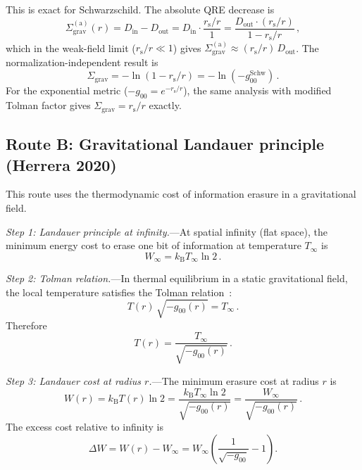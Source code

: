 \documentclass[aps,prd,preprint,superscriptaddress,longbibliography]{revtex4-2}
\newcommand{\kB}{k_{\mathrm{B}}}
\newcommand{\rs}{r_{\mathrm{s}}}
\newcommand{\Sgrav}{\Sigma_{\mathrm{grav}}}
\begin{document}
This is exact for Schwarzschild.  The absolute QRE decrease is
\begin{equation}
  \Sgrav^{(\mathrm{a})}(r)
  = D_{\mathrm{in}} - D_{\mathrm{out}}
  = D_{\mathrm{in}}\cdot\frac{\rs/r}{1}
  = \frac{D_{\mathrm{out}}\cdot(\rs/r)}{1-\rs/r}\,,
  \label{eq:Sigma_a}
\end{equation}
which in the weak-field limit ($\rs/r \ll 1$) gives
$\Sgrav^{(\mathrm{a})} \approx (\rs/r)\,D_{\mathrm{out}}$.  The
normalization-independent result is
\begin{equation}
  \boxed{\Sgrav = -\ln(1-\rs/r) = -\ln(-g_{00}^{\mathrm{Schw}})\,.}
  \label{eq:route_a_result}
\end{equation}
For the exponential metric ($-g_{00} = e^{-\rs/r}$), the same analysis
with modified Tolman factor gives $\Sgrav = \rs/r$ exactly.

\subsection{Route B: Gravitational Landauer principle (Herrera 2020)}
\label{sec:routeB}

This route uses the thermodynamic cost of information erasure in
a gravitational field.

\emph{Step 1: Landauer principle at infinity.}---At spatial infinity
(flat space), the minimum energy cost to erase one bit of information
at temperature $T_\infty$ is~\cite{Landauer1961}
\begin{equation}
  W_\infty = \kB T_\infty \ln 2\,.
  \label{eq:Landauer_inf}
\end{equation}

\emph{Step 2: Tolman relation.}---In thermal equilibrium in a static
gravitational field, the local temperature satisfies the Tolman
relation~\cite{Tolman1930}:
\begin{equation}
  T(r)\,\sqrt{-g_{00}(r)} = T_\infty\,.
  \label{eq:Tolman}
\end{equation}
Therefore
\begin{equation}
  T(r) = \frac{T_\infty}{\sqrt{-g_{00}(r)}}\,.
  \label{eq:Tr}
\end{equation}

\emph{Step 3: Landauer cost at radius $r$.}---The minimum erasure cost
at radius $r$ is
\begin{equation}
  W(r) = \kB T(r)\ln 2 = \frac{\kB T_\infty \ln 2}{\sqrt{-g_{00}(r)}}
  = \frac{W_\infty}{\sqrt{-g_{00}(r)}}\,.
  \label{eq:Wr}
\end{equation}
The excess cost relative to infinity is
\begin{equation}
  \Delta W = W(r) - W_\infty
  = W_\infty\!\left(\frac{1}{\sqrt{-g_{00}}} - 1\right).
  \label{eq:DeltaW}
\end{equation}
\end{document}
